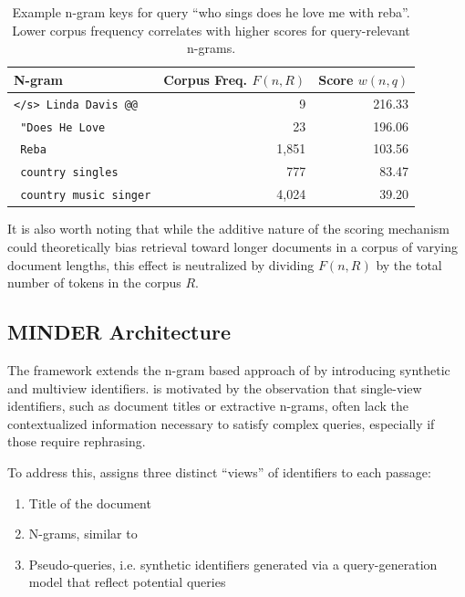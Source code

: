 \begin{table}[htbp]
    \centering
    \small
    \begin{tabular}{lrr}
        \toprule
        \textbf{N-gram} & \textbf{Corpus Freq. $F(n,R)$} & \textbf{Score $w(n,q)$} \\
        \midrule
        \texttt{</s> Linda Davis @@} & 9 & 216.33 \\
        \texttt{ "Does He Love} & 23 & 196.06 \\
        \texttt{ Reba} & 1,851 & 103.56 \\
        \texttt{ country singles} & 777 & 83.47 \\
        \texttt{ country music singer} & 4,024 & 39.20 \\
        \bottomrule
    \end{tabular}
    \caption{Example n-gram keys for query ``who sings does he love me with reba''. Lower corpus frequency correlates with higher scores for query-relevant n-grams.}
    \label{tab:ngram-example}
\end{table}

It is also worth noting that while the additive nature of the scoring mechanism could theoretically bias retrieval toward longer documents in a corpus of varying document lengths, this effect is neutralized by dividing $F(n, R)$ by the total number of tokens in the corpus $R$.

\subsection{MINDER Architecture}
\label{sec:minderarch}
The  framework \cite{yongqi-li-multiview-identifiers} extends the n-gram based approach of  by introducing synthetic and multiview identifiers.  is motivated by the observation that single-view identifiers, such as document titles or extractive n-grams, often lack the contextualized information necessary to satisfy complex queries, especially if those require rephrasing.

To address this,  assigns three distinct ``views'' of identifiers to each passage:
\begin{enumerate}
     \item Title of the document
     \item N-grams, similar to 
     \item Pseudo-queries, i.e. synthetic identifiers generated via a query-generation model that reflect potential queries
\end{enumerate}

